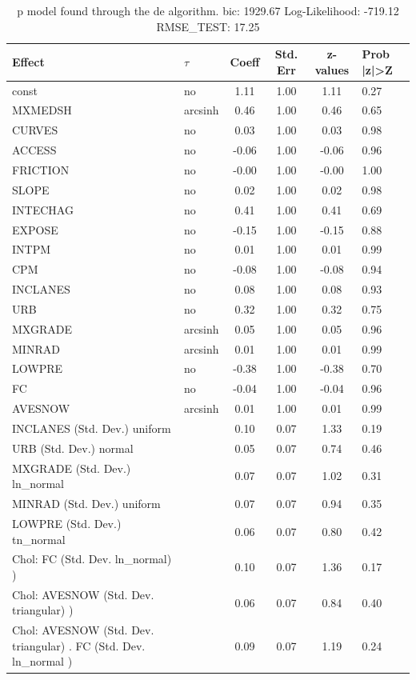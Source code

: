 \begin{table}
	\caption{p model found through the de algorithm. bic: 1929.67 Log-Likelihood: -719.12 RMSE_TEST: 17.25}
	\begin{center}
		\begin{tabular}{|l|l|c|c|c|l|}
			\hline
			Effect & $\tau$ & Coeff & Std. Err & z-values & Prob |z|>Z \\
			\hline
			const & no & 1.11 & 1.00 & 1.11 & 0.27 \\
			\hline
			MXMEDSH & arcsinh & 0.46 & 1.00 & 0.46 & 0.65 \\
			\hline
			CURVES & no & 0.03 & 1.00 & 0.03 & 0.98 \\
			\hline
			ACCESS & no & -0.06 & 1.00 & -0.06 & 0.96 \\
			\hline
			FRICTION & no & -0.00 & 1.00 & -0.00 & 1.00 \\
			\hline
			SLOPE & no & 0.02 & 1.00 & 0.02 & 0.98 \\
			\hline
			INTECHAG & no & 0.41 & 1.00 & 0.41 & 0.69 \\
			\hline
			EXPOSE & no & -0.15 & 1.00 & -0.15 & 0.88 \\
			\hline
			INTPM & no & 0.01 & 1.00 & 0.01 & 0.99 \\
			\hline
			CPM & no & -0.08 & 1.00 & -0.08 & 0.94 \\
			\hline
			INCLANES & no & 0.08 & 1.00 & 0.08 & 0.93 \\
			\hline
			URB & no & 0.32 & 1.00 & 0.32 & 0.75 \\
			\hline
			MXGRADE & arcsinh & 0.05 & 1.00 & 0.05 & 0.96 \\
			\hline
			MINRAD & arcsinh & 0.01 & 1.00 & 0.01 & 0.99 \\
			\hline
			LOWPRE & no & -0.38 & 1.00 & -0.38 & 0.70 \\
			\hline
			FC & no & -0.04 & 1.00 & -0.04 & 0.96 \\
			\hline
			AVESNOW & arcsinh & 0.01 & 1.00 & 0.01 & 0.99 \\
			\hline
			INCLANES (Std. Dev.) uniform &  & 0.10 & 0.07 & 1.33 & 0.19 \\
			\hline
			URB (Std. Dev.) normal &  & 0.05 & 0.07 & 0.74 & 0.46 \\
			\hline
			MXGRADE (Std. Dev.) ln_normal &  & 0.07 & 0.07 & 1.02 & 0.31 \\
			\hline
			MINRAD (Std. Dev.) uniform &  & 0.07 & 0.07 & 0.94 & 0.35 \\
			\hline
			LOWPRE (Std. Dev.) tn_normal &  & 0.06 & 0.07 & 0.80 & 0.42 \\
			\hline
			 Chol: FC (Std. Dev. ln_normal) ) &  & 0.10 & 0.07 & 1.36 & 0.17 \\
			\hline
			 Chol: AVESNOW (Std. Dev. triangular) ) &  & 0.06 & 0.07 & 0.84 & 0.40 \\
			\hline
			 Chol: AVESNOW (Std. Dev. triangular) . FC (Std. Dev.   ln_normal ) &  & 0.09 & 0.07 & 1.19 & 0.24 \\
			\hline
		\end{tabular}
	\end{center}
\end{table}